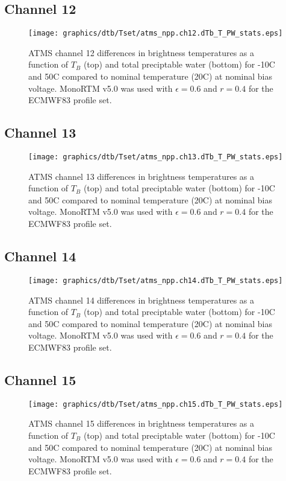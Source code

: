 \subsection{Channel 12}
\begin{figure}[H]
  \label{fig:Tset.ch12_dtb}
  \centering
  \hspace{1.5cm}\texttt{[image: graphics/dtb/Tset/atms\_npp.ch12.dTb\_T\_PW\_stats.eps]}
  \caption{ATMS channel 12 differences in brightness temperatures as a function of $T_B$ (top) and total preciptable water (bottom) for -10\textdegree{}C and 50\textdegree{}C compared to nominal temperature (20\textdegree{}C) at nominal bias voltage. MonoRTM v5.0 was used with $\epsilon=0.6$ and $r=0.4$ for the ECMWF83 profile set.}
\end{figure}

\subsection{Channel 13}
\begin{figure}[H]
  \label{fig:Tset.ch13_dtb}
  \centering
  \hspace{1.5cm}\texttt{[image: graphics/dtb/Tset/atms\_npp.ch13.dTb\_T\_PW\_stats.eps]}
  \caption{ATMS channel 13 differences in brightness temperatures as a function of $T_B$ (top) and total preciptable water (bottom) for -10\textdegree{}C and 50\textdegree{}C compared to nominal temperature (20\textdegree{}C) at nominal bias voltage. MonoRTM v5.0 was used with $\epsilon=0.6$ and $r=0.4$ for the ECMWF83 profile set.}
\end{figure}

\subsection{Channel 14}
\begin{figure}[H]
  \label{fig:Tset.ch14_dtb}
  \centering
  \hspace{1.5cm}\texttt{[image: graphics/dtb/Tset/atms\_npp.ch14.dTb\_T\_PW\_stats.eps]}
  \caption{ATMS channel 14 differences in brightness temperatures as a function of $T_B$ (top) and total preciptable water (bottom) for -10\textdegree{}C and 50\textdegree{}C compared to nominal temperature (20\textdegree{}C) at nominal bias voltage. MonoRTM v5.0 was used with $\epsilon=0.6$ and $r=0.4$ for the ECMWF83 profile set.}
\end{figure}

\subsection{Channel 15}
\begin{figure}[H]
  \label{fig:Tset.ch15_dtb}
  \centering
  \hspace{1.5cm}\texttt{[image: graphics/dtb/Tset/atms\_npp.ch15.dTb\_T\_PW\_stats.eps]}
  \caption{ATMS channel 15 differences in brightness temperatures as a function of $T_B$ (top) and total preciptable water (bottom) for -10\textdegree{}C and 50\textdegree{}C compared to nominal temperature (20\textdegree{}C) at nominal bias voltage. MonoRTM v5.0 was used with $\epsilon=0.6$ and $r=0.4$ for the ECMWF83 profile set.}
\end{figure}

